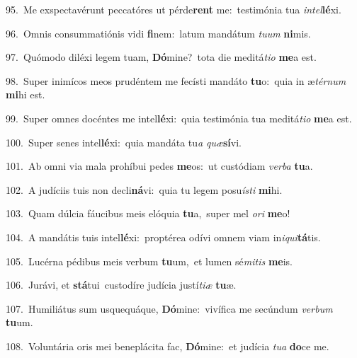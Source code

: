 {\numbfont\textcolor{\numbcolor}{95.}}~Me exspectavérunt peccatóres ut pérde\textbf{rent} me:~\star testimónia tua \textit{in}\-\textit{tel}\textbf{lé}xi.\par
{\numbfont\textcolor{\numbcolor}{96.}}~Omnis consummatiónis vidi \textbf{fi}\-nem:~\star latum mandátum \textit{tu}\-\textit{um} \textbf{ni}\-mis.\par
{\numbfont\textcolor{\numbcolor}{97.}}~Quómodo diléxi legem tuam, \textbf{Dó}\-mine?~\star tota die meditá\-\textit{ti}\-\textit{o} \textbf{me}\-a est.\par
{\numbfont\textcolor{\numbcolor}{98.}}~Super inimícos meos prudéntem me fecísti mandáto \textbf{tu}\-o:~\star quia in æ\-\textit{tér}\-\textit{num} \textbf{mi}\-hi est.\par
{\numbfont\textcolor{\numbcolor}{99.}}~Super omnes docéntes me intel\-\textbf{lé}\-xi:~\star quia testimónia tua meditá\-\textit{ti}\-\textit{o} \textbf{me}\-a est.\par
{\numbfont\textcolor{\numbcolor}{100.}}~Super senes intel\-\textbf{lé}\-xi:~\star quia mandáta tu\textit{a} \textit{quæ}\-\textbf{sí}vi.\par
{\numbfont\textcolor{\numbcolor}{101.}}~Ab omni via mala prohíbui pedes \textbf{me}\-os:~\star ut custódiam \textit{ver}\-\textit{ba} \textbf{tu}\-a.\par
{\numbfont\textcolor{\numbcolor}{102.}}~A judíciis tuis non decli\-\textbf{ná}\-vi:~\star quia tu legem posu\-\textit{ís}\-\textit{ti} \textbf{mi}\-hi.\par
{\numbfont\textcolor{\numbcolor}{103.}}~Quam dúlcia fáucibus meis elóquia \textbf{tu}\-a,~\star super mel \textit{o}\-\textit{ri} \textbf{me}\-o!\par
{\numbfont\textcolor{\numbcolor}{104.}}~A mandátis tuis intel\-\textbf{lé}\-xi:~\star proptérea odívi omnem viam in\-\textit{i}\-\textit{qui}\textbf{tá}tis.\par
{\numbfont\textcolor{\numbcolor}{105.}}~Lucérna pédibus meis verbum \textbf{tu}\-um,~\star et lumen sé\-\textit{mi}\-\textit{tis} \textbf{me}\-is.\par
{\numbfont\textcolor{\numbcolor}{106.}}~Jurávi, et \textbf{stá}\-tui~\star custodíre judícia justí\-\textit{ti}\-\textit{æ} \textbf{tu}\-æ.\par
{\numbfont\textcolor{\numbcolor}{107.}}~Humiliátus sum usquequáque, \textbf{Dó}\-mine:~\star vivífica me secúndum \textit{ver}\-\textit{bum} \textbf{tu}\-um.\par
{\numbfont\textcolor{\numbcolor}{108.}}~Voluntária oris mei beneplácita fac, \textbf{Dó}\-mine:~\star et judícia \textit{tu}\-\textit{a} \textbf{do}\-ce me.\par
